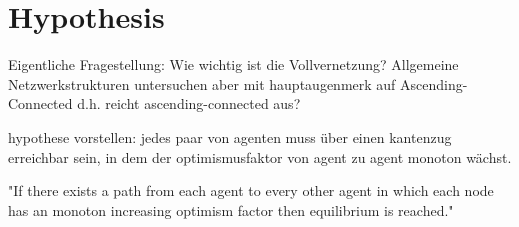 \documentclass[Bachelorarbeit.tex]{subfiles}
\begin{document}
\chapter{Hypothesis}
Eigentliche Fragestellung: Wie wichtig ist die Vollvernetzung?
	Allgemeine Netzwerkstrukturen untersuchen aber mit hauptaugenmerk auf Ascending-Connected d.h. reicht ascending-connected aus?

hypothese vorstellen: jedes paar von agenten muss über einen kantenzug erreichbar sein, in dem der optimismusfaktor von agent zu agent monoton wächst.


"If there exists a path from each agent to every other agent in which each node has an monoton increasing optimism factor then equilibrium is reached."
\end{document}
